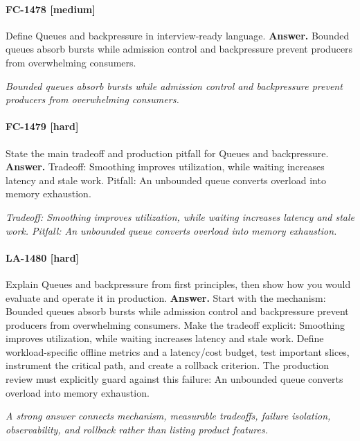 \paragraph{FC-1478 [medium]} Define Queues and backpressure in interview-ready language.
\noindent\textbf{Answer.} Bounded queues absorb bursts while admission control and backpressure prevent producers from overwhelming consumers.
\par\textit{Bounded queues absorb bursts while admission control and backpressure prevent producers from overwhelming consumers.}
\paragraph{FC-1479 [hard]} State the main tradeoff and production pitfall for Queues and backpressure.
\noindent\textbf{Answer.} Tradeoff: Smoothing improves utilization, while waiting increases latency and stale work. Pitfall: An unbounded queue converts overload into memory exhaustion.
\par\textit{Tradeoff: Smoothing improves utilization, while waiting increases latency and stale work. Pitfall: An unbounded queue converts overload into memory exhaustion.}
\paragraph{LA-1480 [hard]} Explain Queues and backpressure from first principles, then show how you would evaluate and operate it in production.
\noindent\textbf{Answer.} Start with the mechanism: Bounded queues absorb bursts while admission control and backpressure prevent producers from overwhelming consumers. Make the tradeoff explicit: Smoothing improves utilization, while waiting increases latency and stale work. Define workload-specific offline metrics and a latency/cost budget, test important slices, instrument the critical path, and create a rollback criterion. The production review must explicitly guard against this failure: An unbounded queue converts overload into memory exhaustion.
\par\textit{A strong answer connects mechanism, measurable tradeoffs, failure isolation, observability, and rollback rather than listing product features.}
